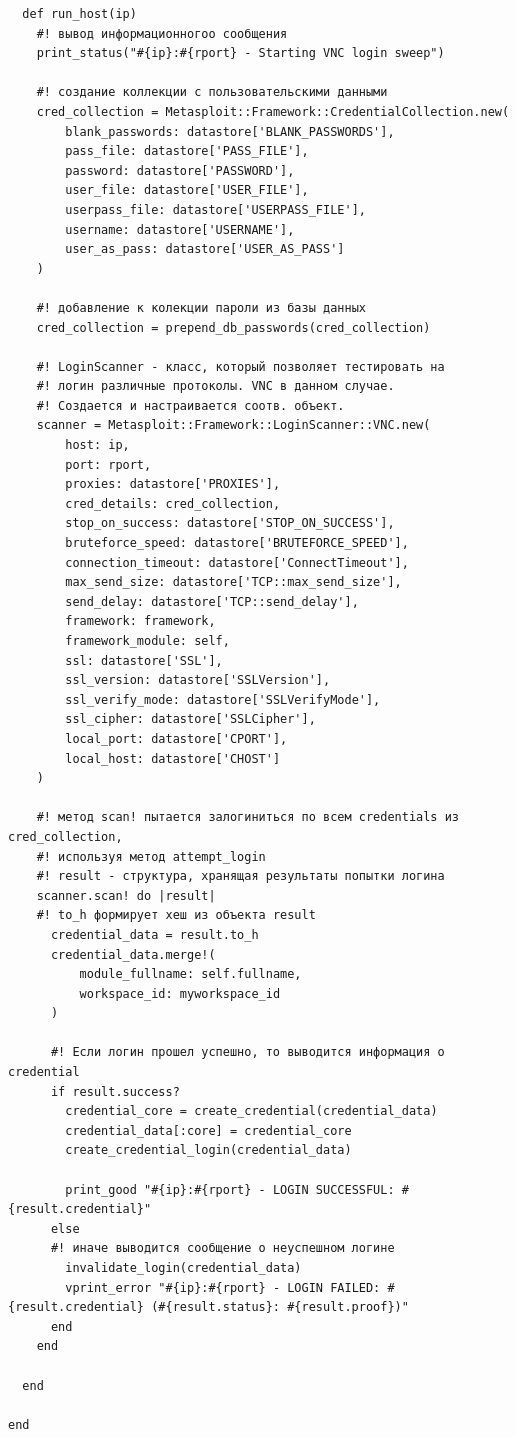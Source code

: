 \documentclass[10pt,a4paper,titlepage]{article}
\begin{document}
\begin{verbatim}
  def run_host(ip)
    #! вывод информационногоо сообщения
    print_status("#{ip}:#{rport} - Starting VNC login sweep")
    
    #! создание коллекции с пользовательскими данными
    cred_collection = Metasploit::Framework::CredentialCollection.new(
        blank_passwords: datastore['BLANK_PASSWORDS'],
        pass_file: datastore['PASS_FILE'],
        password: datastore['PASSWORD'],
        user_file: datastore['USER_FILE'],
        userpass_file: datastore['USERPASS_FILE'],
        username: datastore['USERNAME'],
        user_as_pass: datastore['USER_AS_PASS']
    )

    #! добавление к колекции пароли из базы данных
    cred_collection = prepend_db_passwords(cred_collection)
    
    #! LoginScanner - класс, который позволяет тестировать на 
    #! логин различные протоколы. VNC в данном случае.
    #! Создается и настраивается соотв. объект.
    scanner = Metasploit::Framework::LoginScanner::VNC.new(
        host: ip,
        port: rport,
        proxies: datastore['PROXIES'],
        cred_details: cred_collection,
        stop_on_success: datastore['STOP_ON_SUCCESS'],
        bruteforce_speed: datastore['BRUTEFORCE_SPEED'],
        connection_timeout: datastore['ConnectTimeout'],
        max_send_size: datastore['TCP::max_send_size'],
        send_delay: datastore['TCP::send_delay'],
        framework: framework,
        framework_module: self,
        ssl: datastore['SSL'],
        ssl_version: datastore['SSLVersion'],
        ssl_verify_mode: datastore['SSLVerifyMode'],
        ssl_cipher: datastore['SSLCipher'],
        local_port: datastore['CPORT'],
        local_host: datastore['CHOST']
    )

    #! метод scan! пытается залогиниться по всем credentials из cred_collection,
    #! используя метод attempt_login
    #! result - структура, хранящая результаты попытки логина
    scanner.scan! do |result|
    #! to_h формирует хеш из объекта result
      credential_data = result.to_h
      credential_data.merge!(
          module_fullname: self.fullname,
          workspace_id: myworkspace_id
      )
      
      #! Если лoгин прошел успешно, то выводится информация о credential
      if result.success?
        credential_core = create_credential(credential_data)
        credential_data[:core] = credential_core
        create_credential_login(credential_data)

        print_good "#{ip}:#{rport} - LOGIN SUCCESSFUL: #{result.credential}"
      else
      #! иначе выводится сообщение о неуспешном логине
        invalidate_login(credential_data)
        vprint_error "#{ip}:#{rport} - LOGIN FAILED: #{result.credential} (#{result.status}: #{result.proof})"
      end
    end

  end

end
\end{verbatim}
\end{document}
